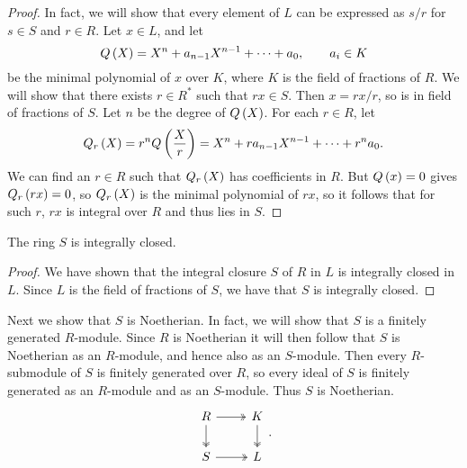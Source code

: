 \begin{proof}
In fact, we will show that every element of $ L $ can be expressed as $ s / r $ for $ s \in S $ and $ r \in R $. Let $ x \in L $, and let
$$ Q\left( X \right) = X^n + a_{n - 1}X^{n - 1} + \dots + a_0, \qquad a_i \in K $$
be the minimal polynomial of $ x $ over $ K $, where $ K $ is the field of fractions of $ R $. We will show that there exists $ r \in R^* $ such that $ rx \in S $. Then $ x = rx / r $, so is in field of fractions of $ S $. Let $ n $ be the degree of $ Q\left( X \right) $. For each $ r \in R $, let
$$ Q_r\left( X \right) = r^nQ\left( \dfrac{X}{r} \right) = X^n + ra_{n - 1}X^{n - 1} + \dots + r^na_0. $$
We can find an $ r \in R $ such that $ Q_r\left( X \right) $ has coefficients in $ R $. But $ Q\left( x \right) = 0 $ gives $ Q_r\left( rx \right) = 0 $, so $ Q_r\left( X \right) $ is the minimal polynomial of $ rx $, so it follows that for such $ r $, $ rx $ is integral over $ R $ and thus lies in $ S $.
\end{proof}

\begin{corollary}
The ring $ S $ is integrally closed.
\end{corollary}

\begin{proof}
We have shown that the integral closure $ S $ of $ R $ in $ L $ is integrally closed in $ L $. Since $ L $ is the field of fractions of $ S $, we have that $ S $ is integrally closed.
\end{proof}

Next we show that $ S $ is Noetherian. In fact, we will show that $ S $ is a finitely generated $ R $-module. Since $ R $ is Noetherian it will then follow that $ S $ is Noetherian as an $ R $-module, and hence also as an $ S $-module. Then every $ R $-submodule of $ S $ is finitely generated over $ R $, so every ideal of $ S $ is finitely generated as an $ R $-module and as an $ S $-module. Thus $ S $ is Noetherian.
$$
\begin{tikzcd}
R \arrow[twoheadrightarrow]{r} \arrow[twoheadrightarrow]{d} & K \arrow[twoheadrightarrow]{d} \\
S \arrow[twoheadrightarrow]{r} & L
\end{tikzcd}.
$$


